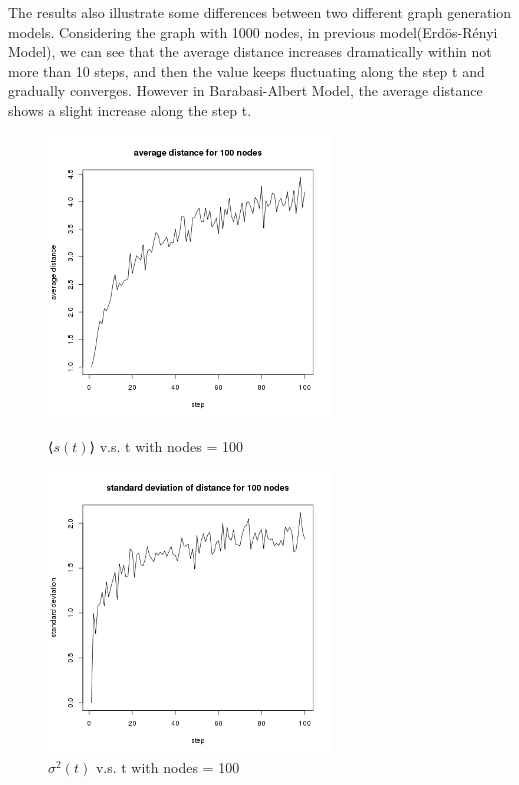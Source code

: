 \documentclass[draftcls,12pt,onecolumn]{IEEEtran}
\begin{document}
The results also illustrate some differences between two different graph generation models. Considering the graph with 1000 nodes, in previous model(Erd\"os-R\'enyi Model), we can see that the average distance increases dramatically within not more than 10 steps, and then the value keeps fluctuating along the step t and gradually converges. However in Barabasi-Albert Model, the average distance shows a slight increase along the step t.
\begin{figure}[htbp]
\centering
\begin{minipage}[t]{0.48\textwidth}
\centering
\includegraphics[width=7.5cm]{2_2_d_100_distance.png}
\caption{⟨$s(t)$⟩ v.s. t with nodes = 100}
\label{fig14}
\end{minipage}
\begin{minipage}[t]{0.48\textwidth}
\centering
\includegraphics[width=7.5cm]{2_2_d_100_deviation.png}
\caption{$\sigma^2(t)$ v.s. t with nodes = 100}
\label{fig15}
\end{minipage}
\end{figure}
\end{document}
